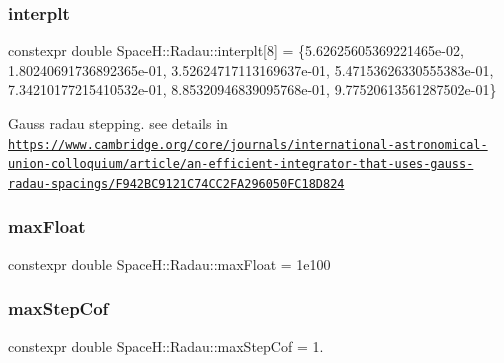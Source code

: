 \subsubsection{\texorpdfstring{interplt}{interplt}}
{\footnotesize\ttfamily constexpr double Space\+H\+::\+Radau\+::interplt\mbox{[}8\mbox{]} = \{5.\+62625605369221465e-\/02, 1.\+80240691736892365e-\/01, 3.\+52624717113169637e-\/01, 5.\+47153626330555383e-\/01, 7.\+34210177215410532e-\/01, 8.\+85320946839095768e-\/01, 9.\+77520613561287502e-\/01\}}

Gauss radau stepping. see details in \href{https://www.cambridge.org/core/journals/international-astronomical-union-colloquium/article/an-efficient-integrator-that-uses-gauss-radau-spacings/F942BC9121C74CC2FA296050FC18D824}{\tt https\+://www.\+cambridge.\+org/core/journals/international-\/astronomical-\/union-\/colloquium/article/an-\/efficient-\/integrator-\/that-\/uses-\/gauss-\/radau-\/spacings/\+F942\+B\+C9121\+C74\+C\+C2\+F\+A296050\+F\+C18\+D824} \mbox{\label{namespace_space_h_1_1_radau_aa1696f42694bdb9870e499a1cf1068d9}} 
\subsubsection{\texorpdfstring{max\+Float}{maxFloat}}
{\footnotesize\ttfamily constexpr double Space\+H\+::\+Radau\+::max\+Float = 1e100}

\mbox{\label{namespace_space_h_1_1_radau_aa4b3264817117df4b43f0b8a176edf69}} 
\subsubsection{\texorpdfstring{max\+Step\+Cof}{maxStepCof}}
{\footnotesize\ttfamily constexpr double Space\+H\+::\+Radau\+::max\+Step\+Cof = 1.}

\mbox{\label{namespace_space_h_1_1_radau_a4f2cef8d9622ff78d76403b062ec33a7}} 
